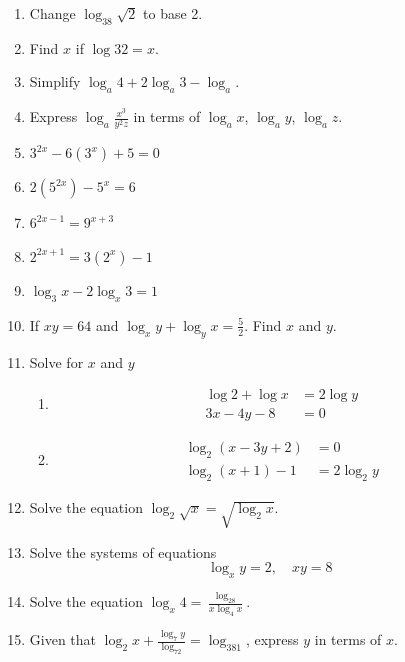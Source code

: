 \documentclass[11pt,a4paper]{article}
\theoremstyle{definition}
\begin{document}
\begin{enumerate}
\item Change $\log_38\sqrt{2}$ to base 2.

\item Find $x$ if $\log 32=x$.

\item Simplify $\log_a4+2\log_a3-\log_a$.

\item Express $\log_a\frac{x^3}{y^2z}$ in terms of $\log_ax$, $\log_ay$, $\log_az$.

\item $3^{2x}-6(3^x)+5=0$

\item $2(5^{2x})-5^x=6$

\item $6^{2x-1}=9^{x+3}$

\item $2^{2x+1}=3(2^x)-1$

\item $\log_3x-2\log_x3=1$

\item If $xy=64$ and $\log_xy+\log_yx=\frac{5}{2}$. Find $x$ and $y$.

\item Solve for $x$ and $y$
\begin{enumerate}
     \item 
\begin{align*}
\log 2+\log x & = 2\log y\\
3x-4y-8 & = 0
\end{align*}

     \item 
\begin{align*}
\log_2(x-3y+2) & =0\\
\log_2(x+1)-1 & = 2\log_2y
\end{align*}
\end{enumerate}

\item Solve the equation $\log_2\sqrt{x}=\sqrt{\log_2x}$.

\item Solve the systems of equations $$\log_xy=2,\quad  xy=8$$

\item Solve the equation $\log_x4=\frac{\log_28}{x\log_4x}$.

\item Given that $\log_2x+\frac{\log_7y}{\log_72}=\log_381$, express $y$ in terms of $x$.


\end{enumerate}
\end{document}
